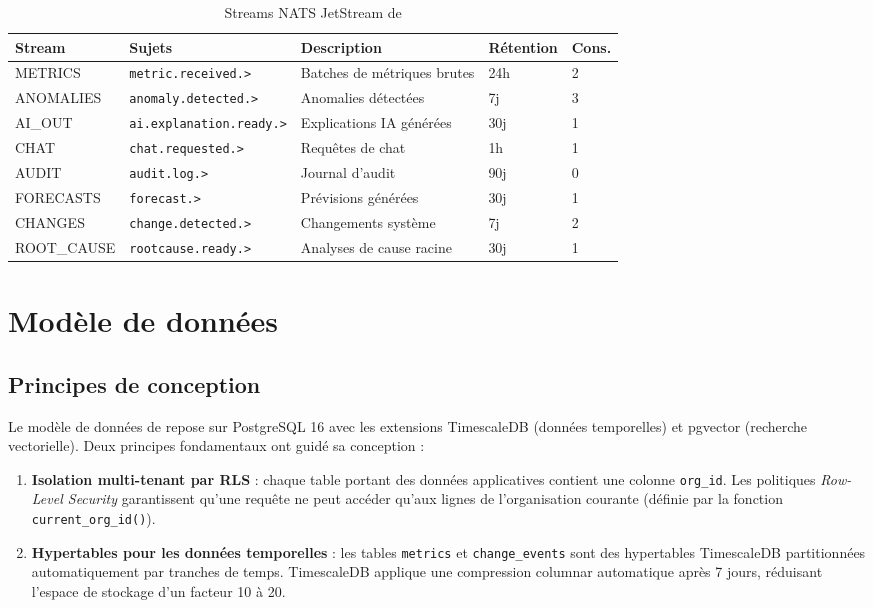 \begin{table}[H]
\centering
\caption{Streams NATS JetStream de \caimp{}}
\label{tab:nats-streams}
\small
\begin{tabularx}{\textwidth}{llXll}
\toprule
\textbf{Stream} & \textbf{Sujets} & \textbf{Description} & \textbf{Rétention} & \textbf{Cons.} \\
\midrule
METRICS    & \texttt{metric.received.>}             & Batches de métriques brutes  & 24h  & 2 \\
ANOMALIES  & \texttt{anomaly.detected.>}            & Anomalies détectées          & 7j   & 3 \\
AI\_OUT    & \texttt{ai.explanation.ready.>}        & Explications IA générées     & 30j  & 1 \\
CHAT       & \texttt{chat.requested.>}              & Requêtes de chat             & 1h   & 1 \\
AUDIT      & \texttt{audit.log.>}                   & Journal d'audit              & 90j  & 0 \\
FORECASTS  & \texttt{forecast.>}                    & Prévisions générées          & 30j  & 1 \\
CHANGES    & \texttt{change.detected.>}             & Changements système          & 7j   & 2 \\
ROOT\_CAUSE& \texttt{rootcause.ready.>}             & Analyses de cause racine     & 30j  & 1 \\
\bottomrule
\end{tabularx}
\end{table}

\section{Modèle de données}

\subsection{Principes de conception}

Le modèle de données de \caimp{} repose sur PostgreSQL 16 avec les extensions
TimescaleDB (données temporelles) et pgvector (recherche vectorielle). Deux
principes fondamentaux ont guidé sa conception :

\begin{enumerate}
  \item \textbf{Isolation multi-tenant par RLS} : chaque table portant des données
    applicatives contient une colonne \texttt{org\_id}. Les politiques
    \textit{Row-Level Security} garantissent qu'une requête ne peut accéder
    qu'aux lignes de l'organisation courante (définie par la fonction
    \texttt{current\_org\_id()}).
  \item \textbf{Hypertables pour les données temporelles} : les tables \texttt{metrics}
    et \texttt{change\_events} sont des hypertables TimescaleDB partitionnées
    automatiquement par tranches de temps. TimescaleDB applique une compression
    columnar automatique après 7 jours, réduisant l'espace de stockage d'un
    facteur 10 à 20.
\end{enumerate}

